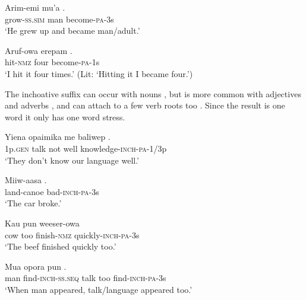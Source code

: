 \ea%
\label{ex:3:x191}
\gll Arim-emi mu'a . \\
grow-\textsc{ss}.\textsc{sim} man become-\textsc{pa}-3s \\
\glt`He grew up and became man/adult.'
\z

\ea%
\label{ex:3:x192}
\gll Aruf-owa erepam . \\
hit-\textsc{nmz} four become-\textsc{pa}-1s \\
\glt`I hit it four times.' (Lit: `Hitting it I became four.')
\z

The inchoative suffix \textstyleEmphasizedVernacularWords{\nobreakdash-} can occur with nouns , but is more common with adjectives  and adverbs , and can attach to a few verb roots too . Since the result is one word it only has one word stress. 

\ea%
\label{ex:3:x193}
\gll Yiena opaimika me baliwep . \\
1p.\textsc{gen} talk not well knowledge-\textsc{inch}-\textsc{pa}-1/3p \\
\glt`They don't know our language well.'
\z

\ea%
\label{ex:3:x194}
\gll Miiw-aasa .{\footnotemark} \\
land-canoe bad-\textsc{inch}-\textsc{pa}-3s \\
\glt`The car broke.'
\z


\ea%
\label{ex:3:x195}
\gll Kau pun weeser-owa  \\
cow too finish-\textsc{nmz} quickly-\textsc{inch}-\textsc{pa}-3s \\
\glt`The beef finished quickly too.'
\z

\ea%
\label{ex:3:x196}
\gll Mua  opora pun . \\
man find-\textsc{inch}-\textsc{ss}.\textsc{seq} talk too find-\textsc{inch}-\textsc{pa}-3s\\
\glt`When man appeared, talk/language appeared too.'
\z

